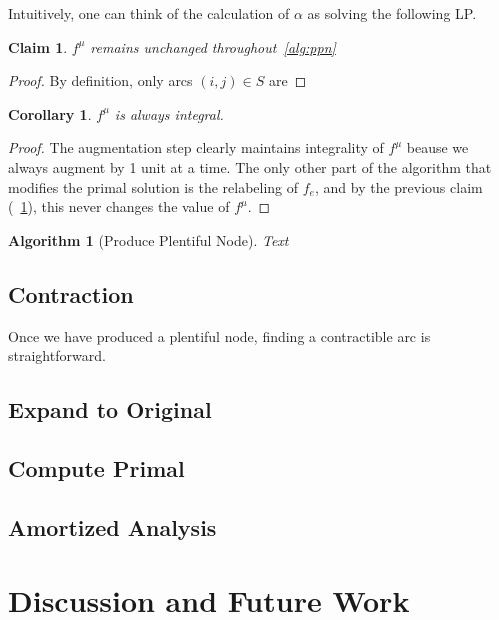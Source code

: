 \documentclass{article}
\newtheorem{corollary}{Corollary}[theorem]
\newtheorem{alg}[theorem]{Algorithm}
\newtheorem{claim}[theorem]{Claim}
\begin{document}
Intuitively, one can think of the calculation of $\alpha$ as solving the following LP.

\begin{claim}
$f^{\mu}$ remains unchanged throughout~\ref{alg:ppn}
\label{claim:fsame}
\end{claim} 
\begin{proof}
By definition, only arcs $(i,j) \in S$ are 
\end{proof}
\begin{corollary}
$f^{\mu}$ is always integral.
\end{corollary}
\begin{proof}
The augmentation step clearly maintains integrality of $f^{\mu}$ beause we always augment by 1 unit at a time. The only other part of the algorithm that modifies the primal solution is the relabeling of $f_e$, and by the previous claim (~\ref{claim:fsame}), this never changes the value of $f^{\mu}$.
\end{proof}

\begin{alg}[Produce Plentiful Node]
Text
\end{alg}

    \subsection{Contraction}
Once we have produced a plentiful node, finding a contractible arc is straightforward. 
    \subsection{Expand to Original}
    \subsection{Compute Primal}
    \subsection{Amortized Analysis}
\section{Discussion and Future Work}

\nocite{*}
\printbibliography
\end{document}
